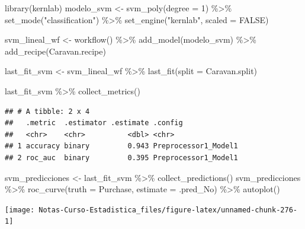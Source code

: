 \documentclass[
  12pt,
]{book}
\newenvironment{Shaded}{\begin{snugshade}}{\end{snugshade}}
\newcommand{\AttributeTok}[1]{\textcolor[rgb]{0.77,0.63,0.00}{#1}}
\newcommand{\ConstantTok}[1]{\textcolor[rgb]{0.00,0.00,0.00}{#1}}
\newcommand{\DecValTok}[1]{\textcolor[rgb]{0.00,0.00,0.81}{#1}}
\newcommand{\FunctionTok}[1]{\textcolor[rgb]{0.00,0.00,0.00}{#1}}
\newcommand{\NormalTok}[1]{#1}
\newcommand{\OtherTok}[1]{\textcolor[rgb]{0.56,0.35,0.01}{#1}}
\newcommand{\SpecialCharTok}[1]{\textcolor[rgb]{0.00,0.00,0.00}{#1}}
\newcommand{\StringTok}[1]{\textcolor[rgb]{0.31,0.60,0.02}{#1}}
\begin{document}
\begin{Shaded}
\begin{Highlighting}[]
\FunctionTok{library}\NormalTok{(kernlab)}
\NormalTok{modelo\_svm }\OtherTok{\textless{}{-}} \FunctionTok{svm\_poly}\NormalTok{(}\AttributeTok{degree =} \DecValTok{1}\NormalTok{) }\SpecialCharTok{\%\textgreater{}\%}
    \FunctionTok{set\_mode}\NormalTok{(}\StringTok{"classification"}\NormalTok{) }\SpecialCharTok{\%\textgreater{}\%}
    \FunctionTok{set\_engine}\NormalTok{(}\StringTok{"kernlab"}\NormalTok{, }\AttributeTok{scaled =} \ConstantTok{FALSE}\NormalTok{)}

\NormalTok{svm\_lineal\_wf }\OtherTok{\textless{}{-}} \FunctionTok{workflow}\NormalTok{() }\SpecialCharTok{\%\textgreater{}\%}
    \FunctionTok{add\_model}\NormalTok{(modelo\_svm) }\SpecialCharTok{\%\textgreater{}\%}
    \FunctionTok{add\_recipe}\NormalTok{(Caravan.recipe)}

\NormalTok{last\_fit\_svm }\OtherTok{\textless{}{-}}\NormalTok{ svm\_lineal\_wf }\SpecialCharTok{\%\textgreater{}\%}
    \FunctionTok{last\_fit}\NormalTok{(}\AttributeTok{split =}\NormalTok{ Caravan.split)}

\NormalTok{last\_fit\_svm }\SpecialCharTok{\%\textgreater{}\%}
    \FunctionTok{collect\_metrics}\NormalTok{()}
\end{Highlighting}
\end{Shaded}

\begin{verbatim}
## # A tibble: 2 x 4
##   .metric  .estimator .estimate .config             
##   <chr>    <chr>          <dbl> <chr>               
## 1 accuracy binary         0.943 Preprocessor1_Model1
## 2 roc_auc  binary         0.395 Preprocessor1_Model1
\end{verbatim}

\begin{Shaded}
\begin{Highlighting}[]
\NormalTok{svm\_predicciones }\OtherTok{\textless{}{-}}\NormalTok{ last\_fit\_svm }\SpecialCharTok{\%\textgreater{}\%}
    \FunctionTok{collect\_predictions}\NormalTok{()}
\NormalTok{svm\_predicciones }\SpecialCharTok{\%\textgreater{}\%}
    \FunctionTok{roc\_curve}\NormalTok{(}\AttributeTok{truth =}\NormalTok{ Purchase, }\AttributeTok{estimate =}\NormalTok{ .pred\_No) }\SpecialCharTok{\%\textgreater{}\%}
    \FunctionTok{autoplot}\NormalTok{()}
\end{Highlighting}
\end{Shaded}

\begin{center}\texttt{[image: Notas-Curso-Estadistica\_files/figure-latex/unnamed-chunk-276-1]} \end{center}
\end{document}
